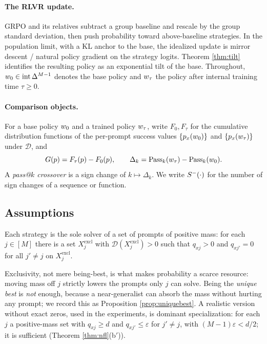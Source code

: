 \paragraph{The RLVR update.}
GRPO and its relatives subtract a group baseline and rescale by the group
standard deviation, then push probability toward above-baseline strategies. In
the population limit, with a KL anchor to the base, the idealized update is
mirror descent / natural policy gradient on the strategy logits. Theorem
\ref{thm:tilt} identifies the resulting policy as an exponential tilt of the
base. Throughout, $w_0\in\mathrm{int}\,\Delta^{M-1}$ denotes the base policy and
$w_\tau$ the policy after internal training time $\tau\ge 0$.

\paragraph{Comparison objects.}
For a base policy $w_0$ and a trained policy $w_\tau$, write
$F_0,F_\tau$ for the cumulative distribution functions of the per-prompt
success values $\{p_x(w_0)\}$ and $\{p_x(w_\tau)\}$ under $\mathcal{D}$, and
\begin{equation}
G(p)=F_\tau(p)-F_0(p),
\qquad
\Delta_k=\mathrm{Pass}_k(w_\tau)-\mathrm{Pass}_k(w_0).
\end{equation}
A \emph{pass@$k$ crossover} is a sign change of $k\mapsto\Delta_k$. We write
$S^{-}(\cdot)$ for the number of sign changes of a sequence or function.

\subsection{Assumptions}

\begin{assumption}
\label{ass:spec}
Each strategy is the sole solver of a set of prompts of positive mass: for each
$j\in[M]$ there is a set $X_j^{\mathrm{excl}}$ with
$\mathcal{D}(X_j^{\mathrm{excl}})>0$ such that $q_{xj}>0$ and $q_{xj'}=0$ for all
$j'\ne j$ on $X_j^{\mathrm{excl}}$.
\end{assumption}

Exclusivity, not mere being-best, is what makes probability a scarce resource:
moving mass off $j$ strictly lowers the prompts only $j$ can solve. Being the
\emph{unique best} is \emph{not} enough, because a near-generalist can absorb the
mass without hurting any prompt; we record this as Proposition
\ref{prop:uniquebest}. A realistic version without exact zeros, used in the
experiments, is dominant specialization: for each $j$ a positive-mass set with
$q_{xj}\ge d$ and $q_{xj'}\le\varepsilon$ for $j'\ne j$, with
$(M-1)\varepsilon<d/2$; it is sufficient (Theorem \ref{thm:nfl}(b$'$)).

